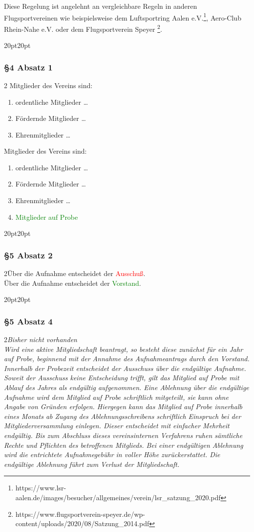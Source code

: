 \documentclass[10pt,a4paper,parskip=half]{scrartcl}
\newcommand{\new}[1]{\textcolor{Green}{#1}}
\newcommand{\old}[1]{\textcolor{Red}{#1}}
\newcommand{\change}[1]{
  \begin{adjustwidth}{20pt}{20pt}
    #1
  \end{adjustwidth}
}
\newcommand{\compare}[3]{\change{\subsubsection*{#1}\begin{multicols}{2}#2\columnbreak\\#3\end{multicols}}}
\begin{document}
  Diese Regelung ist angelehnt an vergleichbare Regeln in anderen Flugsportvereinen wie beispielsweise dem Luftsportring Aalen e.V.\footnote{https://www.lsr-aalen.de/images/besucher/allgemeines/verein/lsr\_satzung\_2020.pdf}, Aero-Club Rhein-Nahe e.V. oder dem Flugsportverein Speyer \footnote{https://www.flugsportverein-speyer.de/wp-content/uploads/2020/08/Satzung\_2014.pdf}.

  \change{
  \subsubsection*{§4 Absatz 1}
  \begin{multicols}{2}
    Mitglieder des Vereins sind:
    \begin{enumerate}[noitemsep]
      \item ordentliche Mitglieder \dots
      \item Fördernde Mitglieder \dots 
      \item Ehrenmitglieder \dots
    \end{enumerate}
    \columnbreak
    Mitglieder des Vereins sind:
    \begin{enumerate}[noitemsep]
      \item ordentliche Mitglieder \dots
      \item Fördernde Mitglieder \dots 
      \item Ehrenmitglieder \dots
      \item \new{Mitglieder auf Probe}
    \end{enumerate}
    \end{multicols}
  }

    \compare{§5 Absatz 2}{Über die Aufnahme entscheidet der \old{Ausschuß}.}{Über die Aufnahme entscheidet der \new{Vorstand}.}
    \clearpage
    \compare{§5 Absatz 4}{\em Bisher nicht vorhanden \em}{Wird eine aktive Mitgliedschaft beantragt,
    so besteht diese zunächst für ein Jahr auf Probe,
    beginnend mit der Annahme des Aufnahmeantrags durch den Vorstand.
    Innerhalb der Probezeit entscheidet der Ausschuss über die endgültige Aufnahme.
    Soweit der Ausschuss keine Entscheidung trifft,
    gilt das Mitglied auf Probe mit Ablauf des Jahres als endgültig aufgenommen.
    Eine Ablehnung über die endgültige Aufnahme wird dem Mitglied auf Probe schriftlich mitgeteilt,
    sie kann ohne Angabe von Gründen erfolgen.
    Hiergegen kann das Mitglied auf Probe innerhalb eines Monats ab Zugang des Ablehnungsschreibens schriftlich Einspruch bei der Mitgliederversammlung einlegen.
    Dieser entscheidet mit einfacher Mehrheit endgültig.
    Bis zum Abschluss dieses vereinsinternen Verfahrens ruhen sämtliche Rechte und Pflichten des betroffenen Mitglieds.
    Bei einer endgültigen Ablehnung wird die entrichtete Aufnahmegebühr in voller Höhe zurückerstattet.
    Die endgültige Ablehnung führt zum Verlust der Mitgliedschaft.}
\end{document}
